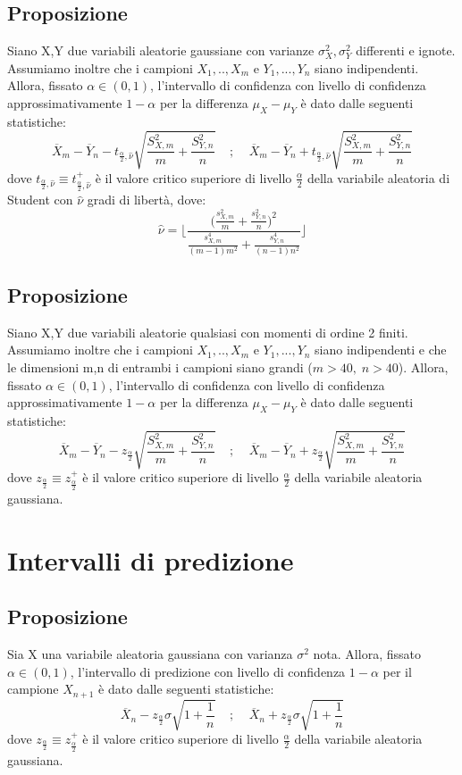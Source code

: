 \documentclass{article}
\begin{document}
\subsection*{Proposizione}
Siano X,Y due variabili aleatorie gaussiane con varianze $\sigma_{X}^{2}, \sigma_{Y}^{2}$ differenti e ignote. Assumiamo inoltre che i campioni $X_{1},..,X_{m}$ e $Y_{1},...,Y_{n}$ siano indipendenti. Allora, fissato $\alpha \in (0,1)$, l'intervallo di confidenza con livello di confidenza approssimativamente $1-\alpha$ per la differenza $\mu_{X}-\mu_{Y}$ è dato dalle seguenti statistiche:
\[ \overline{X}_{m} - \overline{Y}_{n} - t_{\frac{\alpha}{2},\hat{\nu}}\sqrt{\frac{S_{X,m}^{2}}{m}+\frac{S_{Y,n}^{2}}{n}} \; \; \; \; ; \; \; \; \; \overline{X}_{m} - \overline{Y}_{n} + t_{\frac{\alpha}{2},\hat{\nu}}\sqrt{\frac{S_{X,m}^{2}}{m}+\frac{S_{Y,n}^{2}}{n}} \]
dove $t_{\frac{\alpha}{2},\hat{\nu}} \equiv t_{\frac{\alpha}{2},\hat{\nu}}^{+}$ è il valore critico superiore di livello $\frac{\alpha}{2}$ della variabile aleatoria di Student con $\hat{\nu}$ gradi di libertà, dove:
\[ \hat{\nu} = \Bigg \lfloor \frac{\Big( \frac{s_{X,m}^{2}}{m} + \frac{s_{Y,n}^{2}}{n} \Big)^{2}}{\frac{s_{X,m}^{4}}{(m-1)m^{2}} + \frac{s_{Y,n}^{4}}{(n-1)n^{2}}} \Bigg \rfloor \]

\subsection*{Proposizione}
Siano X,Y due variabili aleatorie qualsiasi con momenti di ordine 2 finiti. Assumiamo inoltre che i campioni $X_{1},..,X_{m}$ e $Y_{1},...,Y_{n}$ siano indipendenti e che le dimensioni m,n di entrambi i campioni siano grandi ($m>40, \; n>40$). Allora, fissato $\alpha \in (0,1)$, l'intervallo di confidenza con livello di confidenza approssimativamente $1-\alpha$ per la differenza $\mu_{X}-\mu_{Y}$ è dato dalle seguenti statistiche:
\[ \overline{X}_{m} - \overline{Y}_{n} - z_{\frac{\alpha}{2}}\sqrt{\frac{S_{X,m}^{2}}{m}+\frac{S_{Y,n}^{2}}{n}} \; \; \; \; ; \; \; \; \; \overline{X}_{m} - \overline{Y}_{n} + z_{\frac{\alpha}{2}}\sqrt{\frac{S_{X,m}^{2}}{m}+\frac{S_{Y,n}^{2}}{n}} \]
dove $z_{\frac{\alpha}{2}} \equiv z_{\frac{\alpha}{2}}^{+}$ è il valore critico superiore di livello $\frac{\alpha}{2}$ della variabile aleatoria gaussiana.

\section*{Intervalli di predizione}
\subsection*{Proposizione}
Sia X una variabile aleatoria gaussiana con varianza $\sigma^{2}$ nota. Allora, fissato $\alpha \in (0,1)$, l'intervallo di predizione con livello di confidenza $1-\alpha$ per il campione $X_{n+1}$ è dato dalle seguenti statistiche:
\[ \overline{X}_{n} - z_{\frac{\alpha}{2}} \sigma \sqrt{1 + \frac{1}{n}} \; \; \; \; ; \; \; \; \; \overline{X}_{n} + z_{\frac{\alpha}{2}} \sigma \sqrt{1 + \frac{1}{n}} \]
dove $z_{\frac{\alpha}{2}} \equiv z_{\frac{\alpha}{2}}^{+}$ è il valore critico superiore di livello $\frac{\alpha}{2}$ della variabile aleatoria gaussiana.
\end{document}
